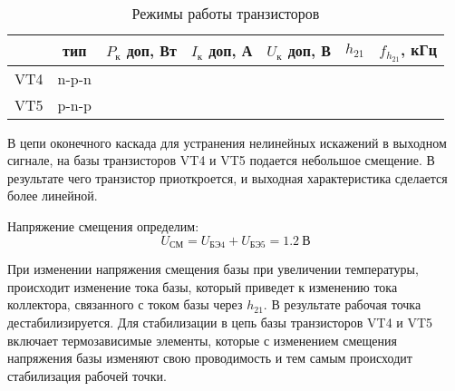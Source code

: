 \begin{table}[htbp]
\caption{Режимы работы транзисторов}
\begin{center}\begin{tabular}{|c|c|c|c|c|c|c|}
\hline 
  & тип & $P_{\text{к}}$ доп, Вт & $I_{\text{к}}$ доп, А & $U_{\text{к}}$ доп, В & $h_{21}$ &  $f_{h_{21}}$, кГц \\ 
\hline 
VT4 & n-p-n &   &  &  &  & \\ 
\hline 
VT5 & p-n-p &   &  &  &  &  \\ 
\hline 
\end{tabular} 
\end{center}
\end{table}

В цепи оконечного каскада для устранения нелинейных искажений в выходном сигнале, на базы транзисторов VT4 и VT5 подается небольшое смещение. В результате чего транзистор приоткроется, и выходная характеристика сделается более линейной. \par
Напряжение смещения определим:
\begin{equation}
\label{eq:equation2_23}
 U_{\text{СМ}} = U_{\text{БЭ4}} + U_{\text{БЭ5}} = 1.2~В                                         
\end{equation}

При изменении напряжения смещения базы при увеличении температуры, происходит изменение тока базы, который приведет к изменению тока коллектора, связанного с током базы через $h_{21}$. В результате рабочая точка дестабилизируется. Для стабилизации в цепь базы транзисторов VT4 и VT5 включает термозависимые элементы, которые с изменением смещения напряжения базы изменяют свою проводимость и тем самым происходит стабилизация рабочей точки.
